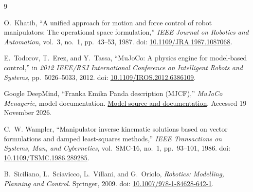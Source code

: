 \documentclass[12pt,a4paper]{article}
\begin{document}
\begin{thebibliography}{9}

O.~Khatib,
``A unified approach for motion and force control of robot manipulators: The operational space formulation,''
\emph{IEEE Journal on Robotics and Automation}, vol.~3, no.~1, pp.~43--53, 1987.
doi: \href{https://doi.org/10.1109/JRA.1987.1087068}{10.1109/JRA.1987.1087068}.

E.~Todorov, T.~Erez, and Y.~Tassa,
``MuJoCo: A physics engine for model-based control,''
in \emph{2012 IEEE/RSJ International Conference on Intelligent Robots and Systems},
pp.~5026--5033, 2012.
doi: \href{https://doi.org/10.1109/IROS.2012.6386109}{10.1109/IROS.2012.6386109}.


Google DeepMind, ``Franka Emika Panda description (MJCF),''
\emph{MuJoCo Menagerie}, model documentation.
\href{https://github.com/google-deepmind/mujoco_menagerie/blob/main/franka_emika_panda/README.md}{Model source and documentation}.
Accessed 19 November 2026.

C.~W. Wampler,
``Manipulator inverse kinematic solutions based on vector formulations and damped least-squares methods,''
\emph{IEEE Transactions on Systems, Man, and Cybernetics}, vol.~SMC-16, no.~1, pp.~93--101, 1986.
doi: \href{https://doi.org/10.1109/TSMC.1986.289285}{10.1109/TSMC.1986.289285}.

B.~Siciliano, L.~Sciavicco, L.~Villani, and G.~Oriolo,
\emph{Robotics: Modelling, Planning and Control}.
Springer, 2009. doi: \href{https://doi.org/10.1007/978-1-84628-642-1}{10.1007/978-1-84628-642-1}.
\end{thebibliography}
\end{document}
